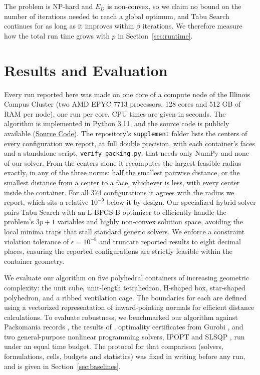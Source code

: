 \documentclass[preprint,12pt]{elsarticle}
\theoremstyle{remark}
\begin{document}
The problem is NP-hard and $E_D$ is non-convex, so we claim no bound on the
number of iterations needed to reach a global optimum, and Tabu Search continues
for as long as it improves within $\beta$ iterations. We therefore measure how
the total run time grows with $p$ in Section~\ref{sec:runtime}.

\section{Results and Evaluation}

Every run reported here was made on one core of a compute node of the Illinois
Campus Cluster (two AMD EPYC 7713 processors, 128 cores and 512 GB of RAM per
node), one run per core. CPU times are given in seconds. The algorithm is
implemented in Python 3.11, and the source code is publicly available
(\href{https://github.com/leadcatlab/continuous-p-dispersion}{Source Code}). The
repository's \texttt{supplement} folder lists the centers of every configuration
we report, at full double precision, with each container's faces and a
standalone script, \texttt{verify\_packing.py}, that needs only NumPy and none
of our solver. From the centers alone it recomputes the largest feasible radius
exactly, in any of the three norms: half the smallest pairwise distance, or the
smallest distance from a center to a face, whichever is less, with every center
inside the container. For all 374 configurations it agrees with the radius we
report, which sits a relative $10^{-9}$ below it by design. Our specialized
hybrid solver pairs Tabu Search with an L-BFGS-B optimizer to efficiently handle
the problem's $3p+1$ variables and highly non-convex solution space, avoiding
the local minima traps that stall standard generic solvers. We enforce a
constraint violation tolerance of $\epsilon=10^{-8}$ and truncate reported
results to eight decimal places, ensuring the reported configurations are
strictly feasible within the container geometry.

We evaluate our algorithm on five polyhedral containers of increasing geometric
complexity: the unit cube, unit-length tetrahedron, H-shaped box, star-shaped
polyhedron, and a ribbed ventilation cage. The boundaries for each are defined
using a vectorized representation of inward-pointing normals for efficient
distance calculations. To evaluate robustness, we benchmarked our algorithm
against Packomania records \citep{packomania}, the results of
\citet{kazakov2018}, optimality certificates from Gurobi \citep{gurobi2026}, and
two general-purpose nonlinear programming solvers, IPOPT \citep{wachter2006} and
SLSQP \citep{kraft1988, scipy2020}, run under an equal time budget. The protocol
for that comparison (solvers, formulations, cells, budgets and statistics) was
fixed in writing before any run, and is given in Section~\ref{sec:baselines}.
\end{document}
